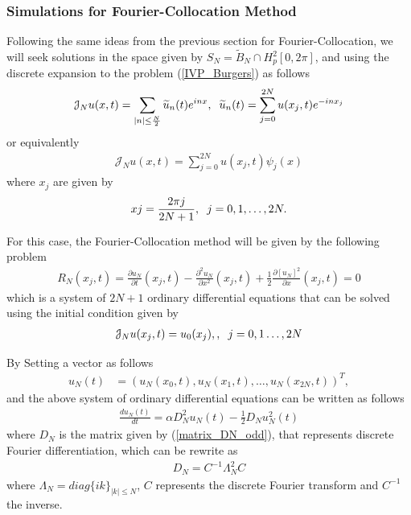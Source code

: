 \subsubsection{Simulations for Fourier-Collocation Method}
	
	Following the same ideas from the previous section for Fourier-Collocation, we will seek solutions in the space given by $S_N = \widetilde{B}_N \cap H^2_p [0, 2 \pi]$, and using the discrete expansion to the problem (\ref{IVP_Burgers}) as follows
	\begin{align*}
		\mathcal{J}_N u (x, t) =  \displaystyle \sum_{|n| \leq \frac{N}{2}} \widetilde{u}_n (t) e^{inx}, \hspace{2mm}
		\widetilde{u}_n (t) =  \displaystyle \sum_{j=0}^{2N} u (x_j, t)  e^{-in x_j}
	\end{align*}
	or equivalently
	\begin{align*}
		\mathcal{J}_N u (x, t) =  \displaystyle \sum_{j=0}^{2N} u (x_j, t) \psi_j (x)
	\end{align*} 
	where $x_j$ are given by
	\begin{align*}
		xj = \frac{2 \pi j}{2N + 1}, \hspace{2mm} j = 0, 1, \dots, 2N.
	\end{align*}
	
	For this case, the Fourier-Collocation method will be given by the following problem
	\begin{align}
	\label{Collocation_Nonlinear}	
		R_{N} (x_j, t) = \frac{\partial u_N}{\partial t} (x_j, t) - \frac{\partial^2 u_N }{\partial x^2} (x_j, t) + \frac{1}{2} \frac{\partial \left[ u_N \right]^2}{\partial x} (x_j, t) = 0
	\end{align}
	which is a system of $2N + 1$ ordinary differential equations that can be solved using the initial condition given by
	\begin{align*}
		\mathcal{J}_N u (x_j, t) =  u_0 (x_j), , \hspace{2mm} j = 0, 1 \dots, 2N
	\end{align*}
	
	By Setting a vector as follows
	\begin{align*}
		u_N (t) &= (u_N (x_0 , t), u_N (x_1 , t), \dots , u_N (x_{2N} , t))^T,
	\end{align*} 
	and the above system of ordinary differential equations can be written as follows
	\begin{align*}
		\frac{d u_N (t)}{dt} =  \alpha D_N^2 u_N (t) - \frac{1}{2} D_N u^2_N (t)
	\end{align*}
	where $D_N$ is the matrix given by (\ref{matrix_DN_odd}), that represents discrete Fourier differentiation, which can be rewrite as
	\begin{align}
		D_N = \displaystyle C^{-1} \Lambda^2_N C
	\end{align}
	where $\Lambda_N = diag \{ ik \}_{|k|\leq N}$, $C$ represents the discrete Fourier transform and $C^{-1}$ the inverse. \\
	
